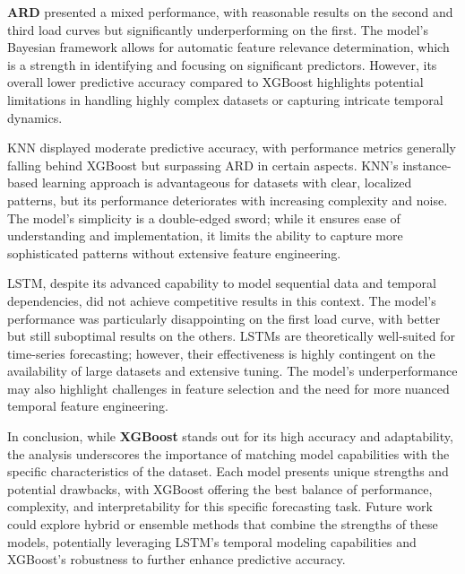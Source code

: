 \documentclass{article} %
\begin{document}
\textbf{ARD }presented a mixed performance, with reasonable results on the second and third load curves but significantly underperforming on the first. The model's Bayesian framework allows for automatic feature relevance determination, which is a strength in identifying and focusing on significant predictors. However, its overall lower predictive accuracy compared to XGBoost highlights potential limitations in handling highly complex datasets or capturing intricate temporal dynamics.

KNN displayed moderate predictive accuracy, with performance metrics generally falling behind XGBoost but surpassing ARD in certain aspects. KNN's instance-based learning approach is advantageous for datasets with clear, localized patterns, but its performance deteriorates with increasing complexity and noise. The model's simplicity is a double-edged sword; while it ensures ease of understanding and implementation, it limits the ability to capture more sophisticated patterns without extensive feature engineering.

LSTM, despite its advanced capability to model sequential data and temporal dependencies, did not achieve competitive results in this context. The model's performance was particularly disappointing on the first load curve, with better but still suboptimal results on the others. LSTMs are theoretically well-suited for time-series forecasting; however, their effectiveness is highly contingent on the availability of large datasets and extensive tuning. The model's underperformance may also highlight challenges in feature selection and the need for more nuanced temporal feature engineering.

In conclusion, while \textbf{XGBoost} stands out for its high accuracy and adaptability, the analysis underscores the importance of matching model capabilities with the specific characteristics of the dataset. Each model presents unique strengths and potential drawbacks, with XGBoost offering the best balance of performance, complexity, and interpretability for this specific forecasting task. Future work could explore hybrid or ensemble methods that combine the strengths of these models, potentially leveraging LSTM's temporal modeling capabilities and XGBoost's robustness to further enhance predictive accuracy.
\end{document}
